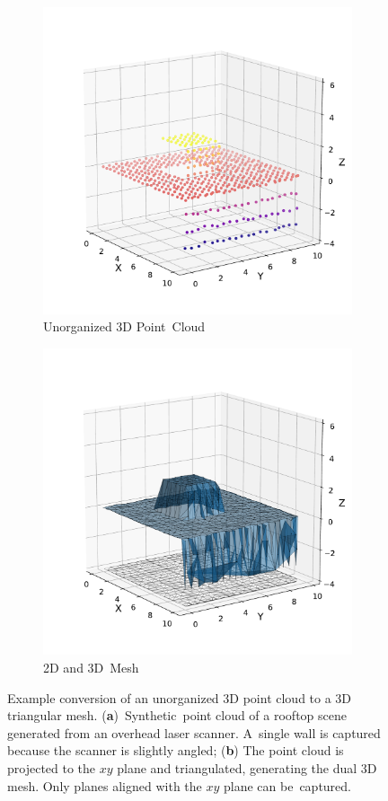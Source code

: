 \vspace{-6pt}

\begin{figure}[H]
\centering
  \begin{subfigure}{.48\linewidth}
    \centering\includegraphics[width=.65\linewidth]{chapter_3_polylidar3d/imgs/Basic25DAlgorithm_pointcloud.pdf}
    \caption{\label{fig:ch3_25DPoints}Unorganized 3D Point~Cloud}\vspace{6pt}
  \end{subfigure}
  \begin{subfigure}{.48\linewidth}
    \centering\includegraphics[width=.65\linewidth]{chapter_3_polylidar3d/imgs/Basic25DAlgorithm_mesh.pdf}
    \caption{\label{fig:ch3_25DMesh}2D and 3D~Mesh}\vspace{6pt}
  \end{subfigure}
  \caption{Example conversion of an unorganized 3D point cloud to a 3D triangular mesh. (\textbf{a})~Synthetic~point cloud of a  rooftop scene generated from an overhead laser scanner. A~single wall is captured because the scanner is slightly angled; (\textbf{b}) The point cloud is projected to the $xy$ plane and triangulated, generating the dual 3D mesh. Only planes aligned with the $xy$ plane can be~captured.  }\label{fig:ch3_25DMeshCreation}
\end{figure}

